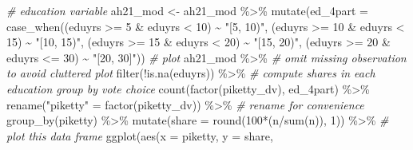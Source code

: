 \documentclass[
]{article}
\newenvironment{Shaded}{\begin{snugshade}}{\end{snugshade}}
\newcommand{\AttributeTok}[1]{\textcolor[rgb]{0.77,0.63,0.00}{#1}}
\newcommand{\CommentTok}[1]{\textcolor[rgb]{0.56,0.35,0.01}{\textit{#1}}}
\newcommand{\DecValTok}[1]{\textcolor[rgb]{0.00,0.00,0.81}{#1}}
\newcommand{\FunctionTok}[1]{\textcolor[rgb]{0.00,0.00,0.00}{#1}}
\newcommand{\NormalTok}[1]{#1}
\newcommand{\OtherTok}[1]{\textcolor[rgb]{0.56,0.35,0.01}{#1}}
\newcommand{\SpecialCharTok}[1]{\textcolor[rgb]{0.00,0.00,0.00}{#1}}
\newcommand{\StringTok}[1]{\textcolor[rgb]{0.31,0.60,0.02}{#1}}
\begin{document}
\begin{Shaded}
\begin{Highlighting}[]
\CommentTok{\# education variable }
\NormalTok{ah21\_mod }\OtherTok{\textless{}{-}}\NormalTok{ ah21\_mod }\SpecialCharTok{\%\textgreater{}\%}
  \FunctionTok{mutate}\NormalTok{(}\AttributeTok{ed\_4part =} \FunctionTok{case\_when}\NormalTok{((eduyrs }\SpecialCharTok{\textgreater{}=} \DecValTok{5} \SpecialCharTok{\&}\NormalTok{ eduyrs }\SpecialCharTok{\textless{}} \DecValTok{10}\NormalTok{) }\SpecialCharTok{\textasciitilde{}} \StringTok{"[5, 10)"}\NormalTok{,}
\NormalTok{                              (eduyrs }\SpecialCharTok{\textgreater{}=} \DecValTok{10} \SpecialCharTok{\&}\NormalTok{ eduyrs }\SpecialCharTok{\textless{}} \DecValTok{15}\NormalTok{) }\SpecialCharTok{\textasciitilde{}} \StringTok{"[10, 15)"}\NormalTok{,}
\NormalTok{                              (eduyrs }\SpecialCharTok{\textgreater{}=} \DecValTok{15} \SpecialCharTok{\&}\NormalTok{ eduyrs }\SpecialCharTok{\textless{}} \DecValTok{20}\NormalTok{) }\SpecialCharTok{\textasciitilde{}} \StringTok{"[15, 20)"}\NormalTok{, }
\NormalTok{                              (eduyrs }\SpecialCharTok{\textgreater{}=} \DecValTok{20} \SpecialCharTok{\&}\NormalTok{ eduyrs }\SpecialCharTok{\textless{}=} \DecValTok{30}\NormalTok{) }\SpecialCharTok{\textasciitilde{}} \StringTok{"[20, 30]"}\NormalTok{))}
\CommentTok{\# plot }
\NormalTok{ah21\_mod }\SpecialCharTok{\%\textgreater{}\%}
  \CommentTok{\# omit missing observation to avoid cluttered plot }
  \FunctionTok{filter}\NormalTok{(}\SpecialCharTok{!}\FunctionTok{is.na}\NormalTok{(eduyrs)) }\SpecialCharTok{\%\textgreater{}\%}
  \CommentTok{\# compute shares in each education group by vote choice }
  \FunctionTok{count}\NormalTok{(}\FunctionTok{factor}\NormalTok{(piketty\_dv), ed\_4part) }\SpecialCharTok{\%\textgreater{}\%}
  \FunctionTok{rename}\NormalTok{(}\StringTok{"piketty"} \OtherTok{=} \StringTok{\textasciigrave{}}\AttributeTok{factor(piketty\_dv)}\StringTok{\textasciigrave{}}\NormalTok{) }\SpecialCharTok{\%\textgreater{}\%} \CommentTok{\# rename for convenience }
  \FunctionTok{group\_by}\NormalTok{(piketty) }\SpecialCharTok{\%\textgreater{}\%}
  \FunctionTok{mutate}\NormalTok{(}\AttributeTok{share =} \FunctionTok{round}\NormalTok{(}\DecValTok{100}\SpecialCharTok{*}\NormalTok{(n}\SpecialCharTok{/}\FunctionTok{sum}\NormalTok{(n)), }\DecValTok{1}\NormalTok{)) }\SpecialCharTok{\%\textgreater{}\%}
  \CommentTok{\# plot this data frame }
  \FunctionTok{ggplot}\NormalTok{(}\FunctionTok{aes}\NormalTok{(}\AttributeTok{x =}\NormalTok{ piketty, }\AttributeTok{y =}\NormalTok{ share, }

\end{Highlighting}
\end{Shaded}
\end{document}
